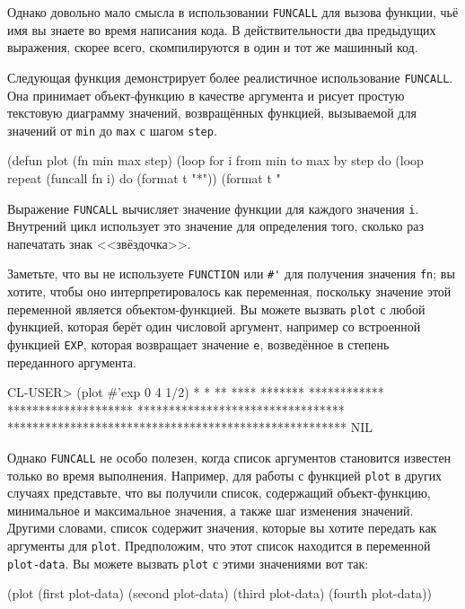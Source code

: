 Однако довольно мало смысла в использовании \lstinline{FUNCALL} для вызова функции, чьё имя вы
знаете во время написания кода.  В действительности два предыдущих выражения, скорее всего,
скомпилируются в один и тот же машинный код.

Следующая функция демонстрирует более реалистичное использование \lstinline{FUNCALL}.  Она
принимает объект-функцию в качестве аргумента и рисует простую текстовую диаграмму
значений, возвращённых функцией, вызываемой для значений от \lstinline{min} до \lstinline{max} с
шагом \lstinline{step}.

\begin{myverb}
(defun plot (fn min max step)
  (loop for i from min to max by step do
        (loop repeat (funcall fn i) do (format t "*"))
        (format t "~%
\end{myverb}

Выражение \lstinline{FUNCALL} вычисляет значение функции для каждого значения \lstinline{i}.
Внутрений цикл использует это значение для определения того, сколько раз напечатать знак
<<звёздочка>>.

Заметьте, что вы не используете \lstinline{FUNCTION} или \lstinline!#'! для получения значения
\lstinline{fn}; вы хотите, чтобы оно интерпретировалось как переменная, поскольку значение этой
переменной является объектом-функцией.  Вы можете вызвать \lstinline{plot} с любой функцией,
которая берёт один числовой аргумент, например со встроенной функцией \lstinline{EXP}, которая
возвращает значение \lstinline{e}, возведённое в степень переданного аргумента.

\begin{myverb}
CL-USER> (plot #'exp 0 4 1/2)
*
*
**
****
*******
************
********************
*********************************
******************************************************
NIL
\end{myverb}

Однако \lstinline{FUNCALL} не особо полезен, когда список аргументов становится известен только
во время выполнения.  Например, для работы с функцией \lstinline{plot} в других случаях
представьте, что вы получили список, содержащий объект-функцию, минимальное и максимальное
значения, а также шаг изменения значений.  Другими словами, список содержит значения,
которые вы хотите передать как аргументы для \lstinline{plot}.  Предположим, что этот список
находится в переменной \lstinline{plot-data}.  Вы можете вызвать \lstinline{plot} с этими значениями
вот так:

\begin{myverb}
(plot 
  (first plot-data) 
  (second plot-data) 
  (third plot-data) 
  (fourth plot-data))
\end{myverb}

